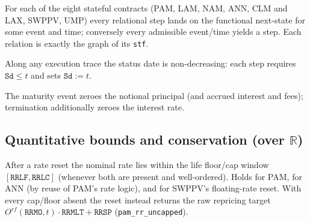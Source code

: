 \begin{theorem}\label{thm:agree}
        \leanok
        For each of the eight stateful contracts (PAM, LAM, NAM, ANN, CLM and
        LAX, SWPPV, UMP) every relational step lands on the functional next-state
        for some event and time; conversely every admissible event/time yields a
        step.  Each relation is exactly the graph of its \texttt{stf}.
\end{theorem}

\begin{theorem}\label{thm:mono}
        \leanok
        Along any execution trace the status date is non-decreasing: each step
        requires $\mathtt{Sd} \le t$ and sets $\mathtt{Sd} := t$.
\end{theorem}

\begin{theorem}[Maturity]\label{thm:maturity}
        \leanok
        The maturity event zeroes the notional principal (and accrued interest
        and fees); termination additionally zeroes the interest rate.
\end{theorem}

\subsection{Quantitative bounds and conservation (over $\mathbb{R}$)}

\begin{theorem}\label{thm:rate-bound}
        \leanok
        After a rate reset the nominal rate lies within the life floor/cap
        window $[\mathtt{RRLF}, \mathtt{RRLC}]$ (whenever both are present and
        well-ordered).  Holds for PAM, for ANN (by reuse of PAM's rate logic),
        and for SWPPV's floating-rate reset.  With every cap/floor absent the
        reset instead returns the raw repricing target
        $O^{rf}(\mathtt{RRMO},t)\cdot\mathtt{RRMLT}+\mathtt{RRSP}$
        (\texttt{pam\_rr\_uncapped}).
\end{theorem}

